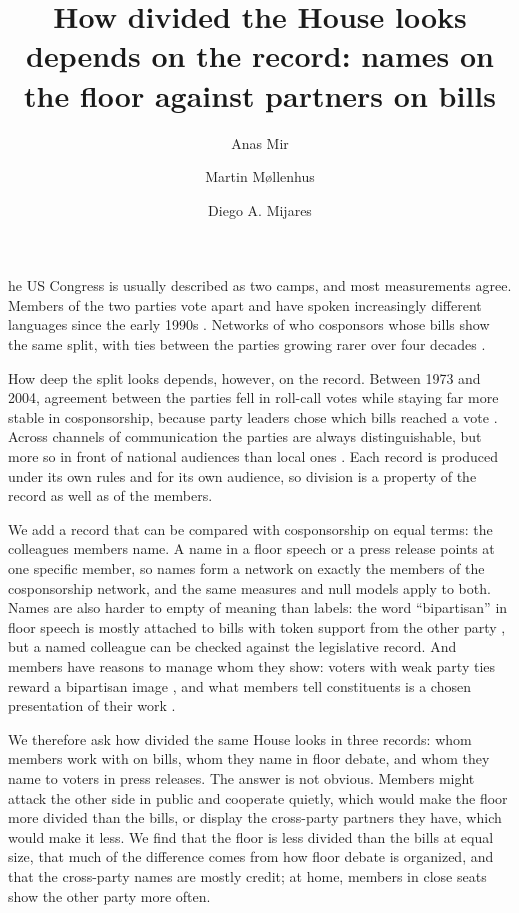 \documentclass[9pt,twocolumn,twoside]{pnas-new}
\title{How divided the House looks depends on the record: names on the floor against partners on bills}
\author[a]{Anas Mir}
\author[a]{Martin M{\o}llenhus}
\author[a]{Diego A. Mijares}
\affil[a]{Technical University of Denmark, 02805 Social Graphs and Interactions}
\begin{document}
\maketitle
\thispagestyle{firststyle}

he US Congress is usually described as two camps, and most measurements agree. Members of the two
parties vote apart and have spoken increasingly different languages since the early 1990s \cite{gentzkow2019}.
Networks of who cosponsors whose bills \cite{fowler2006} show the same split, with ties between the parties growing
rarer over four decades \cite{neal2020}.

How deep the split looks depends, however, on the record. Between 1973 and 2004, agreement between the parties fell
in roll-call votes while staying far more stable in cosponsorship, because party leaders chose which bills reached
a vote \cite{harbridge2015}. Across channels of communication the parties are always distinguishable, but more so
in front of national audiences than local ones \cite{green2024}. Each record is produced under its own rules and
for its own audience, so division is a property of the record as well as of the members.

We add a record that can be compared with cosponsorship on equal terms: the colleagues members name. A name in a
floor speech or a press release points at one specific member, so names form a network on exactly the members of
the cosponsorship network, and the same measures and null models apply to both. Names are also harder to empty of
meaning than labels: the word ``bipartisan'' in floor speech is mostly attached to bills with token support from the
other party \cite{westwood2022}, but a named colleague can be checked against the legislative record. And members
have reasons to manage whom they show: voters with weak party ties reward a bipartisan image \cite{harbridge2011},
and what members tell constituents is a chosen presentation of their work \cite{grimmer2013}.

We therefore ask how divided the same House looks in three records: whom members work with on bills, whom they name
in floor debate, and whom they name to voters in press releases. The answer is not obvious. Members might attack
the other side in public and cooperate quietly, which would make the floor more divided than the bills, or display
the cross-party partners they have, which would make it less. We find that the floor is less divided than the bills
at equal size, that much of the difference comes from how floor debate is organized, and that the cross-party names
are mostly credit; at home, members in close seats show the other party more often.
\end{document}
